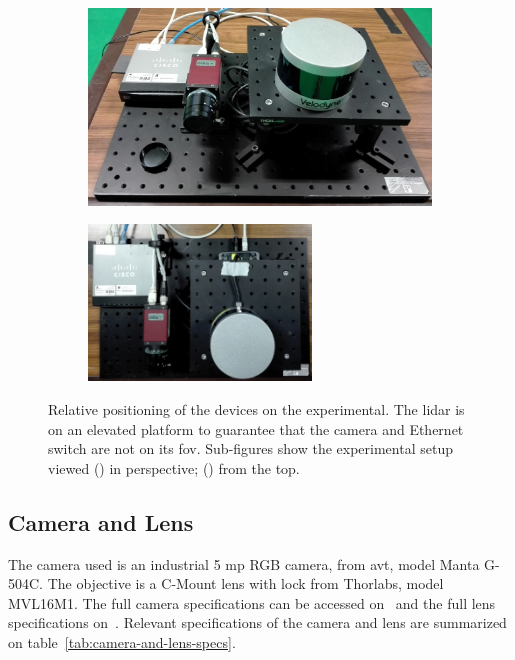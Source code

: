 \begin{figure}[!ht]
	\centering
	\begin{subfigure}[c]{0.45\textwidth}
		\includegraphics[width=\textwidth]{img/experimental-setup/table-setup-cambada-perspective.jpg}
		\caption{}
		\label{fig:experimental-setup:perspective}
	\end{subfigure}
	\qquad
	\begin{subfigure}[c]{0.45\textwidth}
		\includegraphics[width=0.65\textwidth, keepaspectratio, angle=90]{img/experimental-setup/table-setup-cambada-birds-eye.jpg}
		\caption{}
		\label{fig:experimental-setup:birds-eye}
	\end{subfigure}
	\caption{Relative positioning of the devices on the experimental. The \ac{lidar} is on an elevated platform to guarantee that the camera and Ethernet switch are not on its \ac{fov}. Sub-figures show the experimental setup viewed () in perspective; () from the top.}
	\label{fig:experimental-setup}
\end{figure}

\subsection{Camera and Lens}
The camera used is an industrial 5 \ac{mp} RGB camera, from \acf{avt}, model Manta G-504C. The objective is a C-Mount lens with lock from Thorlabs\cp, model MVL16M1. The full camera specifications can be accessed on~\cite{MantaG504C} and the full lens specifications on~\cite{Thorlabs}. Relevant specifications of the camera and lens are summarized  on table~\ref{tab:camera-and-lens-specs}. 

